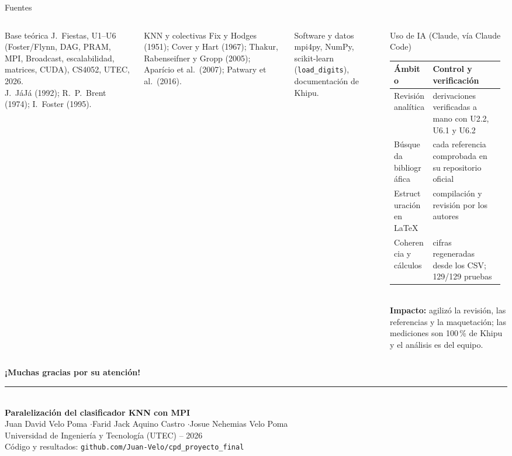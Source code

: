 \documentclass[aspectratio=169,10pt]{beamer}
\renewenvironment{block}[1]{\begin{caja}[cajagris]{#1}}{\end{caja}}
\begin{document}
\begin{frame}{Fuentes}
\begin{columns}[T]
\begin{block}{Base teórica}
\footnotesize J.~Fiestas, U1--U6 (Foster/Flynn, DAG, PRAM, MPI, Broadcast, escalabilidad, matrices, CUDA), CS4052, UTEC, 2026.\\
J.~JáJá (1992); R.~P.~Brent (1974); I.~Foster (1995).
\end{block}
\begin{block}{KNN y colectivas}
\footnotesize Fix y Hodges (1951); Cover y Hart (1967); Thakur, Rabenseifner y Gropp (2005); Aparício et al.\ (2007); Patwary et al.\ (2016).
\end{block}
\begin{block}{Software y datos}
\footnotesize mpi4py, NumPy, scikit-learn (\texttt{load\_digits}), documentación de Khipu.
\end{block}
\begin{block}{Uso de IA (Claude, vía Claude Code)}
\scriptsize
\renewcommand{\arraystretch}{1.25}
\begin{tabular}{@{}>{\raggedright\arraybackslash}p{0.33\linewidth}>{\raggedright\arraybackslash}p{0.61\linewidth}@{}}
\textbf{Ámbito} & \textbf{Control y verificación}\\\midrule
Revisión analítica & derivaciones verificadas a mano con U2.2, U6.1 y U6.2\\
Búsqueda bibliográfica & cada referencia comprobada en su repositorio oficial\\
Estructuración en \LaTeX & compilación y revisión por los autores\\
Coherencia y cálculos & cifras regeneradas desde los CSV; 129/129 pruebas\\
\end{tabular}\\[3pt]
\textbf{Impacto:} agilizó la revisión, las referencias y la maquetación; las mediciones son 100\,\% de Khipu y el análisis es del equipo.
\end{block}
\end{columns}
\end{frame}

{
\begin{frame}[plain]
\centering
\vspace{1.6cm}
{\color{navy}\fontsize{20}{24}\selectfont\bfseries ¡Muchas gracias por su atención!}\\[8pt]
{\color{cian}\rule{2.6cm}{1.6pt}}\\[10pt]
{\color{navy}\small\bfseries Paralelización del clasificador KNN con MPI}\\[8pt]
{\color{gristxt}\scriptsize Juan David Velo Poma \quad$\cdot$\quad Farid Jack Aquino Castro \quad$\cdot$\quad Josue Nehemias Velo Poma}\\[4pt]
{\color{gristxt}\scriptsize Universidad de Ingeniería y Tecnología (UTEC) -- 2026}\\[10pt]
{\color{cian}\scriptsize Código y resultados: \texttt{github.com/Juan-Velo/cpd\_proyecto\_final}}
\end{frame}}
\end{document}
